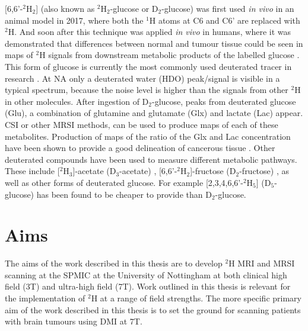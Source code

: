 [6,6'-$^2$H$_2$] (also known as $^2$H$_2$-glucose or D$_2$-glucose) was first used \textit{in vivo} in an animal model \cite{Lu2017QuantitativeSpectroscopy} in 2017, where both the $^1$H atoms at C6 and C6' are replaced with $^2$H. And soon after this technique was applied \textit{in vivo} in humans, where it was demonstrated that differences between normal and tumour tissue could be seen in maps of $^2$H signals from downstream metabolic products of the labelled glucose \cite{DeFeyter2018DeuteriumVivo}. This form of glucose is currently the most commonly used deuterated tracer in research \cite{DeFeyter2018DeuteriumVivo,DeFeyter2021DeuteriumFuture,Ruhm2022Dynamic9.4T,Roig2022Deuterium7T,deGraaf2020OnImaging}. At \ac{NA} only a deuterated water (HDO) peak/signal is visible in a typical spectrum, because the noise level is higher than the signals from other $^2$H in other molecules. After ingestion of D$_2$-glucose, peaks from deuterated glucose (Glu), a combination of glutamine and glutamate (Glx) and lactate (Lac) appear. \ac{CSI} or other \ac{MRSI} methods, can be used to produce maps of each of these metabolites. Production of maps of the ratio of the Glx and Lac concentration have been shown to provide a good delineation of cancerous tissue \cite{DeFeyter2018DeuteriumVivo,Straathof2021DeuteriumBrain}. Other deuterated compounds have been used to measure different metabolic pathways. These include [$^2$H$_3$]-acetate (D$_3$-acetate) \cite{DeFeyter2018DeuteriumVivo,Rich20201HVivo}, [6,6'-$^2$H$_2$]-fructose (D$_2$-fructose) \cite{Zhang202366-2H2Cancer}, as well as other forms of deuterated glucose. For example [2,3,4,6,6'-$^2$H$_5$] (D$_5$-glucose) \cite{Zou2023AImaging} has been found to be cheaper to provide than D$_2$-glucose.


\section{Aims}

The aims of the work described in this thesis are to develop $^2$H \ac{MRI} and \ac{MRSI} scanning at the \ac{SPMIC} at the University of Nottingham at both clinical high field (3T) and ultra-high field (7T). Work outlined in this thesis is relevant for the implementation of $^2$H at a range of field strengths. The more specific primary aim of the work described in this thesis is to set the ground for scanning patients with brain tumours using DMI at 7T.

